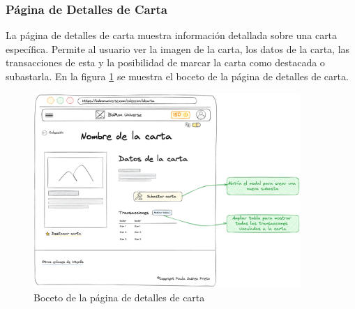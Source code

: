 \subsubsection{Página de Detalles de Carta}
La página de detalles de carta muestra información detallada sobre una carta específica. Permite al usuario ver la imagen de la carta, los datos de la carta, 
las transacciones de esta y la posibilidad de marcar la carta como destacada o subastarla.
En la figura \ref{fig:p_card_details} se muestra el boceto de la página de detalles de carta.
\begin{figure}[H]
    \centering
    \includegraphics[width=0.9\textwidth]{figures/6-Analisis/6-Interfaz/prototipos/detalle-carta.png}
    \caption{Boceto de la página de detalles de carta}
    \label{fig:p_card_details}
\end{figure}

